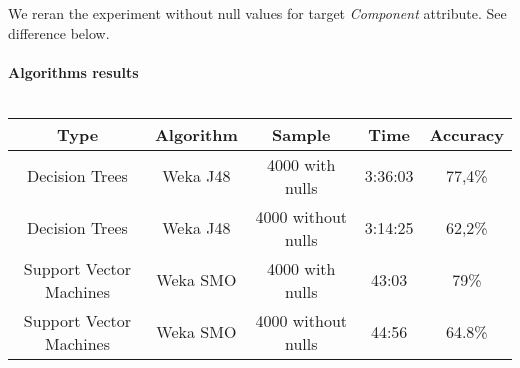 We reran the experiment without null values for target {\it Component} attribute. See difference below.
\\
\\
{\bf Algorithms results}
\\
\\
\begin{tabular}{|c|c|c|c|c|}
\hline
Type     &       Algorithm   & Sample &  Time &  Accuracy   \\
\hline
\hline
Decision Trees & Weka J48    & 4000  with nulls &   3:36:03 &    77,4\%  \\
Decision Trees & Weka J48    & 4000  without nulls &  3:14:25  &    62,2\%  \\
Support Vector Machines & Weka SMO    & 4000  with nulls &   43:03 &    79\%  \\
Support Vector Machines & Weka SMO    & 4000  without nulls &  44:56 &    64.8\%  \\
\hline
\end{tabular}
\\
\\
%
%
%
%
%
